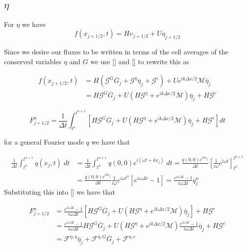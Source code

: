 \documentclass[12pt]{article}
\begin{document}
\subsection{$\eta$}

For $\eta$ we have 
\[f(x_{j+1/2},t) = H\upsilon_{j+1/2} + U \eta_{j+1/2}\]

Since we desire our fluxes to be written in terms of the cell averages of the conserved variables $\eta$ and $G$ we use [] and [] to rewrite this as

\begin{align}
f(x_{j+1/2},t) &= H\left(\mathcal{G}^G \overline{G}_j + \mathcal{G}^\eta \overline{\eta}_j + \mathcal{G}^c\right) + U e^{i {k\Delta x}/{2}}\mathcal{M} \overline{\eta}_j \\ &= H\mathcal{G}^G \overline{G}_j + U\left(H\mathcal{G}^\eta + e^{i {k\Delta x}/{2}}\mathcal{M} \right) \overline{\eta}_j + H\mathcal{G}^c
\end{align}

\begin{equation}
F^n_{j+1/2} = \frac{1}{\Delta t} \int_{t^n}^{t^{n+1}}\left[ H\mathcal{G}^G \overline{G}_j + U\left(H\mathcal{G}^\eta + e^{i {k\Delta x}/{2}}\mathcal{M} \right) \overline{\eta}_j + H\mathcal{G}^c\right] dt
\end{equation}


for a general Fourier mode $q$ we have that

\begin{align}
\frac{1}{\Delta t} \int_{t^n}^{t^{n+1}} q(x_j,t)\; dt &= \frac{1}{\Delta t} \int_{t^n}^{t^{n+1}} q(0,0) e^{i\left(\omega t + kx_j\right)} \; dt = \frac{q(0,0)e^{i k  x_j}}{\Delta t} \left[\frac{1}{i\omega} e^{i\omega t}\right]_{t^n}^{t^{n+1}} \\ &= \frac{q(0,0)e^{i k  x_j}}{\Delta t}  \frac{1}{i\omega} e^{i\omega t^n} \left[e^{i\omega \Delta t} -1\right] = \frac{e^{i\omega \Delta t} -1}{i\omega\Delta t} q^n_j
\end{align}
Substituting this into [] we have that 

\begin{align}
F^n_{j+1/2} &= \frac{e^{i\omega \Delta t} -1}{i\omega\Delta t} \left[H\mathcal{G}^G \overline{G}_j + U\left(H\mathcal{G}^\eta + e^{i {k\Delta x}/{2}} \mathcal{M} \right) \overline{\eta}_j  \right] +  H\mathcal{G}^c \\
&= \frac{e^{i\omega \Delta t} -1}{i\omega\Delta t} H\mathcal{G}^G \overline{G}_j +  U\left(H\mathcal{G}^\eta + e^{i {k\Delta x}/{2}} \mathcal{M}\right)\frac{e^{i\omega \Delta t} -1}{i\omega\Delta t} \overline{\eta}_j  +  H\mathcal{G}^c  \\
&=\mathcal{F}^{\eta,\eta}\overline{\eta}_j + \mathcal{F}^{\eta,G}\overline{G}_j + \mathcal{F}^{\eta,c}
\end{align}
\end{document}
